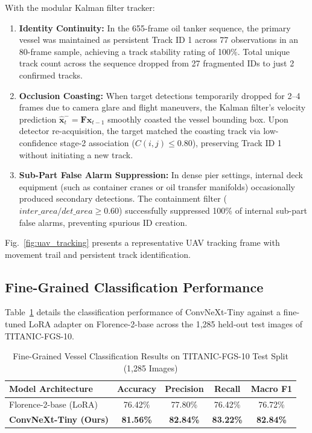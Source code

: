 \documentclass[conference]{IEEEtran}
\begin{document}
With the modular Kalman filter tracker:
\begin{enumerate}
    \item \textbf{Identity Continuity:} In the 655-frame oil tanker sequence, the primary vessel was maintained as persistent Track ID 1 across 77 observations in an 80-frame sample, achieving a track stability rating of 100\%. Total unique track count across the sequence dropped from 27 fragmented IDs to just 2 confirmed tracks.
    \item \textbf{Occlusion Coasting:} When target detections temporarily dropped for 2--4 frames due to camera glare and flight maneuvers, the Kalman filter's velocity prediction $\hat{\mathbf{x}}_t^- = \mathbf{F} \mathbf{x}_{t-1}$ smoothly coasted the vessel bounding box. Upon detector re-acquisition, the target matched the coasting track via low-confidence stage-2 association ($C(i, j) \le 0.80$), preserving Track ID 1 without initiating a new track.
    \item \textbf{Sub-Part False Alarm Suppression:} In dense pier settings, internal deck equipment (such as container cranes or oil transfer manifolds) occasionally produced secondary detections. The containment filter ($inter\_area / det\_area \ge 0.60$) successfully suppressed 100\% of internal sub-part false alarms, preventing spurious ID creation.
\end{enumerate}
Fig.~\ref{fig:uav_tracking} presents a representative UAV tracking frame with movement trail and persistent track identification.

\subsection{Fine-Grained Classification Performance}
Table~\ref{tab:classification_results} details the classification performance of ConvNeXt-Tiny against a fine-tuned LoRA adapter on Florence-2-base across the 1,285 held-out test images of TITANIC-FGS-10.

\begin{table}[htbp]
\centering
\caption{Fine-Grained Vessel Classification Results on TITANIC-FGS-10 Test Split (1,285 Images)}
\label{tab:classification_results}
\begin{tabular}{lcccc}
\toprule
\textbf{Model Architecture} & \textbf{Accuracy} & \textbf{Precision} & \textbf{Recall} & \textbf{Macro F1} \\
\midrule
Florence-2-base (LoRA)      & 76.42\% & 77.80\% & 76.42\% & 76.72\% \\
\textbf{ConvNeXt-Tiny (Ours)} & \textbf{81.56\%} & \textbf{82.84\%} & \textbf{83.22\%} & \textbf{82.84\%} \\
\bottomrule
\end{tabular}
\end{table}
\end{document}

